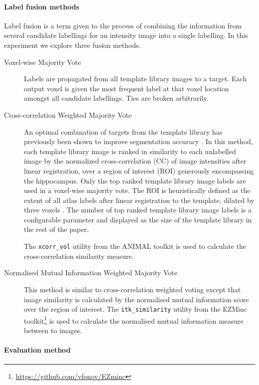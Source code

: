 \documentclass{article}\usepackage{graphicx, color}
\newcommand{\animal}{ANIMAL }
\begin{document}
\paragraph{Label fusion methods}
Label fusion is a term given to the process of combining the information from
several candidate labellings for an intensity image into a single labelling.  In
this experiment we explore three fusion methods. 
\begin{description}
  \item[Voxel-wise Majority Vote]
  Labels are propagated from all template library images to a target.  Each
  output voxel is given the most frequent label at that voxel location amongst
  all candidate labellings.  Ties are broken arbitrarily.

  \item[Cross-correlation Weighted Majority Vote]
  An optimal combination of targets from the template library has previously been
  shown to improve segmentation accuracy \citep{Aljabar2009,Collins2010}.  In this
  method, each template library image is ranked in similarity to each unlabelled 
  image by the normalized cross-correlation (CC) of image intensities after linear
  registration, over a region of interest (ROI) generously encompassing the 
  hippocampus.  Only the top ranked template library image labels are used in a
  voxel-wise majority vote. The ROI is heuristically defined as the extent of all
  atlas labels after linear registration to the template, dilated by three voxels
  \citep{MallarChakravarty2012}.  The number of top ranked template library image labels
  is a configurable parameter and displayed as the size of the template library
  in the rest of the paper. 

  The {\tt xcorr\_vol} utility from the \animal toolkit is used to calculate the
  cross-correlation similarity measure.  
 
  \item[Normalised Mutual Information Weighted Majority Vote]
  This method is similar to cross-correlation weighted voting except that image
  similarity is calculated by the normalised mutual information score over the
  region of interest\citep{Studholme2001}.  The {\tt itk\_similarity} utility
  from the EZMinc toolkit\footnote{\url{https://github.com/vfonov/EZminc}} is
  used to calculate the normalised mutual information measure between to images.
\end{description}
\paragraph{Evaluation method}  
\end{document}
